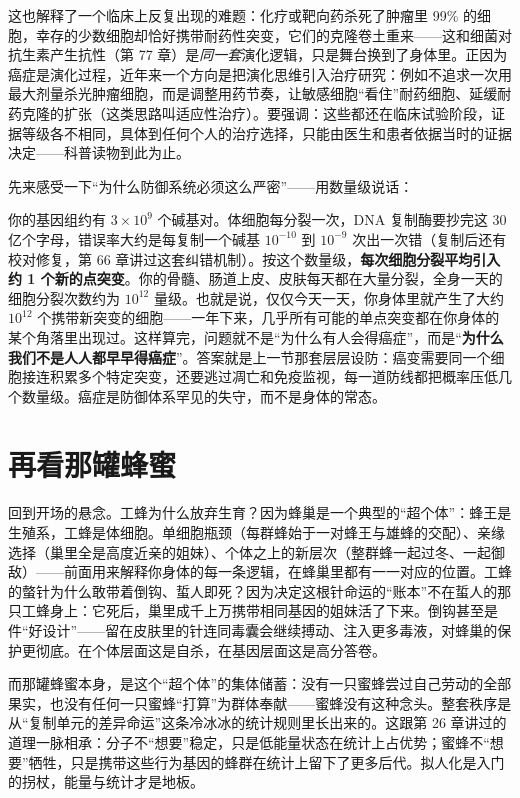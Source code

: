 这也解释了一个临床上反复出现的难题：化疗或靶向药杀死了肿瘤里 99\% 的细胞，幸存的少数细胞却恰好携带耐药性突变，它们的克隆卷土重来——这和细菌对抗生素产生抗性（第 77 章）是\emph{同一套}演化逻辑，只是舞台换到了身体里。正因为癌症是演化过程，近年来一个方向是把演化思维引入治疗研究：例如不追求一次用最大剂量杀光肿瘤细胞，而是调整用药节奏，让敏感细胞“看住”耐药细胞、延缓耐药克隆的扩张（这类思路叫适应性治疗）。要强调：这些都还在临床试验阶段，证据等级各不相同，具体到任何个人的治疗选择，只能由医生和患者依据当时的证据决定——科普读物到此为止。

先来感受一下“为什么防御系统必须这么严密”——用数量级说话：

\begin{qiaoliang}
你的基因组约有 $3\times 10^{9}$ 个碱基对。体细胞每分裂一次，DNA 复制酶要抄完这 30 亿个字母，错误率大约是每复制一个碱基 $10^{-10}$ 到 $10^{-9}$ 次出一次错（复制后还有校对修复，第 66 章讲过这套纠错机制）。按这个数量级，\textbf{每次细胞分裂平均引入约 1 个新的点突变}。你的骨髓、肠道上皮、皮肤每天都在大量分裂，全身一天的细胞分裂次数约为 $10^{12}$ 量级。也就是说，仅仅今天一天，你身体里就产生了大约 $10^{12}$ 个携带新突变的细胞——一年下来，几乎所有可能的单点突变都在你身体的某个角落里出现过。这样算完，问题就不是“为什么有人会得癌症”，而是“\textbf{为什么我们不是人人都早早得癌症}”。答案就是上一节那套层层设防：癌变需要同一个细胞接连积累多个特定突变，还要逃过凋亡和免疫监视，每一道防线都把概率压低几个数量级。癌症是防御体系罕见的失守，而不是身体的常态。
\end{qiaoliang}

\section{再看那罐蜂蜜}

回到开场的悬念。工蜂为什么放弃生育？因为蜂巢是一个典型的“超个体”：蜂王是生殖系，工蜂是体细胞。单细胞瓶颈（每群蜂始于一对蜂王与雄蜂的交配）、亲缘选择（巢里全是高度近亲的姐妹）、个体之上的新层次（整群蜂一起过冬、一起御敌）——前面用来解释你身体的每一条逻辑，在蜂巢里都有一一对应的位置。工蜂的螫针为什么敢带着倒钩、蜇人即死？因为决定这根针命运的“账本”不在蜇人的那只工蜂身上：它死后，巢里成千上万携带相同基因的姐妹活了下来。倒钩甚至是件“好设计”——留在皮肤里的针连同毒囊会继续搏动、注入更多毒液，对蜂巢的保护更彻底。在个体层面这是自杀，在基因层面这是高分答卷。

而那罐蜂蜜本身，是这个“超个体”的集体储蓄：没有一只蜜蜂尝过自己劳动的全部果实，也没有任何一只蜜蜂“打算”为群体奉献——蜜蜂没有这种念头。整套秩序是从“复制单元的差异命运”这条冷冰冰的统计规则里长出来的。这跟第 26 章讲过的道理一脉相承：分子不“想要”稳定，只是低能量状态在统计上占优势；蜜蜂不“想要”牺牲，只是携带这些行为基因的蜂群在统计上留下了更多后代。拟人化是入门的拐杖，能量与统计才是地板。

